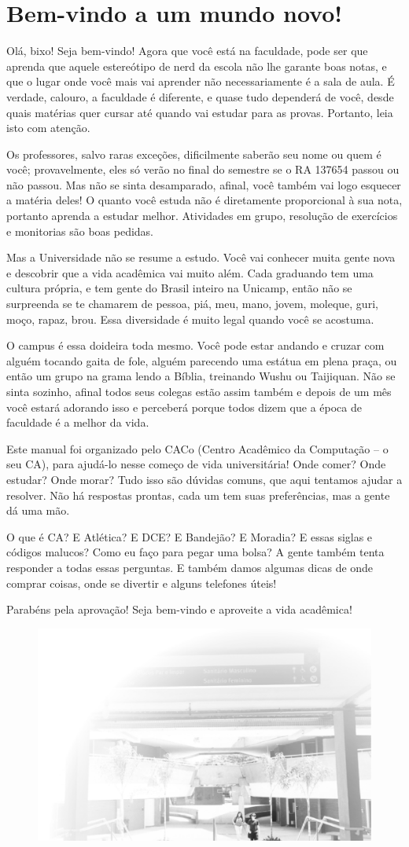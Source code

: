 
\section{Bem-vindo a um mundo novo!}

Olá, bixo! Seja bem-vindo! Agora que você está na faculdade, pode ser que
aprenda que aquele estereótipo de nerd da escola não lhe garante boas notas, e
que o lugar onde você mais vai aprender não necessariamente é a sala de aula. É
verdade, calouro, a faculdade é diferente, e quase tudo dependerá de você, desde
quais matérias quer cursar até quando vai estudar para as provas. Portanto, leia
isto com atenção.

Os professores, salvo raras exceções, dificilmente saberão seu nome ou quem é
você; provavelmente, eles só verão no final do semestre se o RA 137654  passou
ou não passou. Mas não se sinta desamparado, afinal, você também vai logo
esquecer a matéria deles! O quanto você estuda não é diretamente proporcional à
sua nota, portanto aprenda a estudar melhor. Atividades em grupo, resolução de
exercícios e monitorias são boas pedidas.

Mas a Universidade não se resume a estudo. Você vai conhecer muita gente nova e
descobrir que a vida acadêmica vai muito além.  Cada graduando tem uma cultura
própria, e tem gente do Brasil inteiro na Unicamp, então não se surpreenda se te
chamarem de pessoa, piá, meu, mano, jovem, moleque, guri, moço, rapaz, brou.
Essa diversidade é muito legal quando você se acostuma.

O campus é essa doideira toda mesmo. Você pode estar andando e cruzar com alguém
tocando gaita de fole, alguém parecendo uma estátua em plena praça, ou então um
grupo na grama lendo a Bíblia, treinando Wushu ou Taijiquan. Não se sinta
sozinho, afinal todos seus colegas estão assim também e depois de um mês você
estará adorando isso e perceberá porque todos dizem que a época de faculdade é a
melhor da vida.

Este manual foi organizado pelo CACo (Centro Acadêmico da Computação -- o seu
CA), para ajudá-lo nesse começo de vida universitária! Onde comer? Onde estudar?
Onde morar? Tudo isso são dúvidas comuns, que aqui tentamos ajudar a resolver.
Não há respostas prontas, cada um tem suas preferências, mas a gente dá uma mão.

O que é CA? E Atlética? E DCE? E Bandejão? E Moradia? E essas siglas e códigos
malucos? Como eu faço para pegar uma bolsa? A gente também tenta responder a todas
essas perguntas. E também damos algumas dicas de onde comprar coisas, onde se
divertir e alguns telefones úteis!

Parabéns pela aprovação! Seja bem-vindo e aproveite a vida acadêmica!
 
\begin{figure}[t]
    \includegraphics[width=.45\textwidth]{img/ola_mundo/cb.jpg}
\end{figure}
